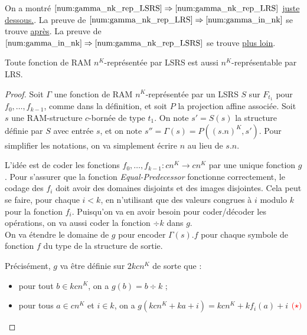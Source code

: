 \begin{appendices}
		On a montré $\ref{num:gamma_nk_rep_LSRS} \Rightarrow \ref{num:gamma_nk_rep_LRS}$ \hyperref[conj:rep_LSRS_rep_LRS]{juste dessous.}. 
		La preuve de $\ref{num:gamma_nk_rep_LRS} \Rightarrow \ref{num:gamma_in_nk}$ se trouve \hyperref[conj:rep_LRS_calc_n_K]{après}.
		La preuve de $\ref{num:gamma_in_nk} \Rightarrow \ref{num:gamma_nk_rep_LSRS}$ se trouve \hyperref[conj:poly_implique_LSRS]{plus loin}.
		
		
		\begin{conj}
			\label{conj:rep_LSRS_rep_LRS}
			Toute fonction de RAM $n^K$-représentée par LSRS est aussi $n^K$-représentable par LRS.
		\end{conj}
		
		\begin{proof}
			
			Soit $\Gamma$ une fonction de RAM $n^K$-représentée par un LSRS $S$ sur $F_{t_1}$ pour $f_0, \dots, f_{k-1}$, comme dans la définition, et soit $P$ la projection affine associée. Soit $s$ une RAM-structure $c$-bornée de type $t_1$. On note $s' = S(s)$ la structure définie par $S$ avec entrée $s$, et on note $s'' = \Gamma(s) = P\left( (s.n)^K, s'\right)$. Pour simplifier les notations, on va simplement écrire $n$ au lieu de $s.n$.
			
			L'idée est de coder les fonctions $f_0, \dots, f_{k-1} : cn^K \to cn^K$ par une unique fonction $g$. Pour s'assurer que la fonction \emph{Equal-Predecessor} fonctionne correctement, le codage des $f_i$ doit avoir des domaines disjoints et des images disjointes. Cela peut se faire, pour chaque $i<k$, en n'utilisant que des valeurs congrues à $i$ modulo $k$ pour la fonction $f_i$. Puisqu'on va en avoir besoin pour coder/décoder les opérations, on va aussi coder la fonction $\div k$ dans $g$.\\
			
			On va étendre le domaine de $g$ pour encoder $\Gamma(s).f$ pour chaque symbole de fonction $f$ du type de la structure de sortie.
			
			Précisément, $g$ va être définie sur $2kcn^K$ de sorte que :
			
			\begin{itemize}[itemsep=-1mm]
				\item	pour tout $b \in kcn^K$, on a $g(b) = b \div k$ ;
				\item 	pour tous $a \in cn^K$ et $i \in k$, on a $g\left( kcn^K + ka + i \right) = kcn^K + k f_i(a) + i$ $\textcolor{red}{(\star)}$
			\end{itemize}
			

\end{proof}
\end{appendices}
